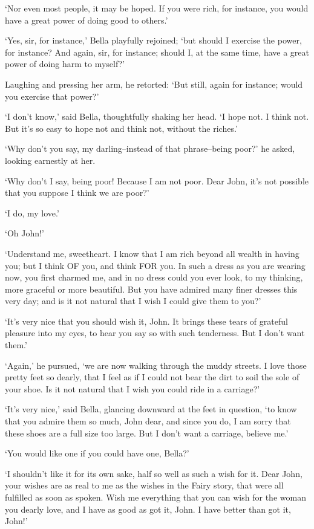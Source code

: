 ‘Nor even most people, it may be hoped. If you were rich, for instance,
you would have a great power of doing good to others.’

‘Yes, sir, for instance,’ Bella playfully rejoined; ‘but should I
exercise the power, for instance? And again, sir, for instance; should
I, at the same time, have a great power of doing harm to myself?’

Laughing and pressing her arm, he retorted: ‘But still, again for
instance; would you exercise that power?’

‘I don’t know,’ said Bella, thoughtfully shaking her head. ‘I hope not.
I think not. But it’s so easy to hope not and think not, without the
riches.’

‘Why don’t you say, my darling--instead of that phrase--being poor?’ he
asked, looking earnestly at her.

‘Why don’t I say, being poor! Because I am not poor. Dear John, it’s not
possible that you suppose I think we are poor?’

‘I do, my love.’

‘Oh John!’

‘Understand me, sweetheart. I know that I am rich beyond all wealth in
having you; but I think OF you, and think FOR you. In such a dress as
you are wearing now, you first charmed me, and in no dress could you
ever look, to my thinking, more graceful or more beautiful. But you have
admired many finer dresses this very day; and is it not natural that I
wish I could give them to you?’

‘It’s very nice that you should wish it, John. It brings these tears of
grateful pleasure into my eyes, to hear you say so with such tenderness.
But I don’t want them.’

‘Again,’ he pursued, ‘we are now walking through the muddy streets. I
love those pretty feet so dearly, that I feel as if I could not bear the
dirt to soil the sole of your shoe. Is it not natural that I wish you
could ride in a carriage?’

‘It’s very nice,’ said Bella, glancing downward at the feet in question,
‘to know that you admire them so much, John dear, and since you do, I
am sorry that these shoes are a full size too large. But I don’t want a
carriage, believe me.’

‘You would like one if you could have one, Bella?’

‘I shouldn’t like it for its own sake, half so well as such a wish for
it. Dear John, your wishes are as real to me as the wishes in the Fairy
story, that were all fulfilled as soon as spoken. Wish me everything
that you can wish for the woman you dearly love, and I have as good as
got it, John. I have better than got it, John!’

